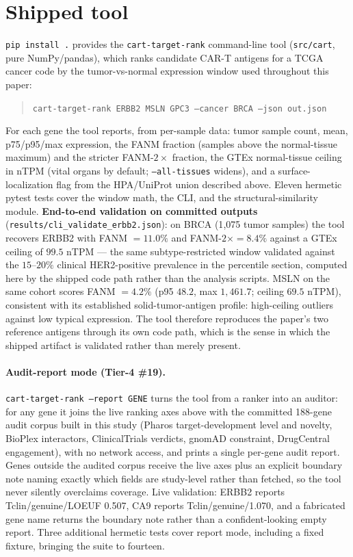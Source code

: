 \documentclass[11pt]{article}
\begin{document}


\section{Shipped tool}
\texttt{pip install .} provides the \texttt{cart-target-rank} command-line tool
(\texttt{src/cart}, pure NumPy/pandas), which ranks candidate CAR-T antigens for
a TCGA cancer code by the tumor-vs-normal expression window used throughout
this paper:
\begin{quote}\texttt{cart-target-rank ERBB2 MSLN GPC3 --cancer BRCA --json out.json}\end{quote}
For each gene the tool reports, from per-sample data: tumor sample count, mean,
p75/p95/max expression, the FANM fraction (samples above the normal-tissue
maximum) and the stricter FANM-$2\times$ fraction, the GTEx normal-tissue
ceiling in nTPM (vital organs by default; \texttt{--all-tissues} widens), and a
surface-localization flag from the HPA/UniProt union described above. Eleven
hermetic pytest tests cover the window math, the CLI, and the
structural-similarity module.
\textbf{End-to-end validation on committed outputs}
(\texttt{results/cli\_validate\_erbb2.json}): on BRCA (1{,}075 tumor samples)
the tool recovers ERBB2 with FANM $=11.0\%$ and FANM-$2\times=8.4\%$ against a
GTEx ceiling of $99.5$ nTPM --- the same subtype-restricted window validated
against the $15$--$20\%$ clinical HER2-positive prevalence in the percentile
section, computed here by the shipped code path rather than the analysis
scripts. MSLN on the same cohort scores FANM $=4.2\%$ (p95 $48.2$, max
$1{,}461.7$; ceiling $69.5$ nTPM), consistent with its established
solid-tumor-antigen profile: high-ceiling outliers against low typical
expression. The tool therefore reproduces the paper's two reference antigens
through its own code path, which is the sense in which the shipped artifact is
validated rather than merely present.

\paragraph{Audit-report mode (Tier-4 \#19).}
\texttt{cart-target-rank --report GENE} turns the tool from a ranker into an
auditor: for any gene it joins the live ranking axes above with the committed
188-gene audit corpus built in this study (Pharos target-development level and
novelty, BioPlex interactors, ClinicalTrials verdicts, gnomAD constraint,
DrugCentral engagement), with no network access, and prints a single
per-gene audit report. Genes outside the audited corpus receive the live axes
plus an explicit boundary note naming exactly which fields are study-level
rather than fetched, so the tool never silently overclaims coverage. Live
validation: ERBB2 reports Tclin/genuine/LOEUF 0.507, CA9 reports
Tclin/genuine/1.070, and a fabricated gene name returns the boundary note
rather than a confident-looking empty report. Three additional hermetic tests
cover report mode, including a fixed fixture, bringing the suite to fourteen.
\end{document}
